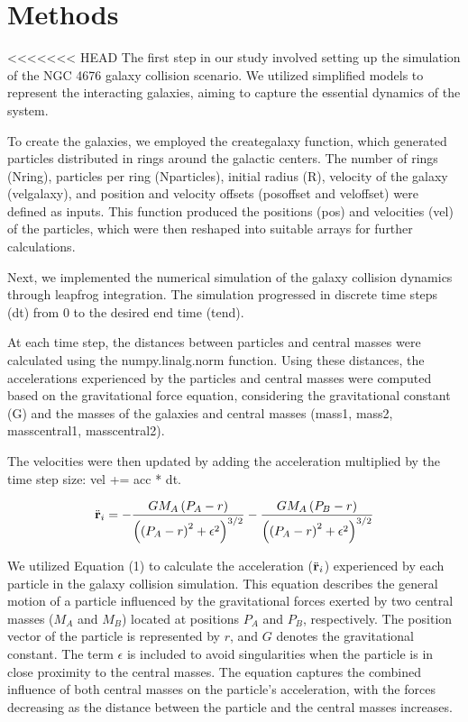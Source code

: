 \documentclass[reprint, amsmath, amssymb, aps]{revtex4-2}
\begin{document}
\section{Methods}
\label{sec:methods}

<<<<<<< HEAD
The first step in our study involved setting up the simulation of the NGC 4676 galaxy collision scenario. We utilized simplified models to represent the interacting galaxies, aiming to capture the essential dynamics of the system.

To create the galaxies, we employed the create\textunderscore galaxy function, which generated particles distributed in rings around the galactic centers. The number of rings (N\textunderscore ring), particles per ring (N\textunderscore particles), initial radius (R), velocity of the galaxy (vel\textunderscore galaxy), and position and velocity offsets (pos\textunderscore offset and vel\textunderscore offset) were defined as inputs. This function produced the positions (pos) and velocities (vel) of the particles, which were then reshaped into suitable arrays for further calculations.

Next, we implemented the numerical simulation of the galaxy collision dynamics through leapfrog integration. The simulation progressed in discrete time steps (dt) from 0 to the desired end time (t\textunderscore end).

At each time step, the distances between particles and central masses were calculated using the numpy.linalg.norm function. Using these distances, the accelerations experienced by the particles and central masses were computed based on the gravitational force equation, considering the gravitational constant (G) and the masses of the galaxies and central masses (mass1, mass2, mass\textunderscore central1, mass\textunderscore central2).

The velocities were then updated by adding the acceleration multiplied by the time step size: vel += acc * dt.

\begin{equation}
\ddot{{\bf r}}_i = - \frac{GM_A\left(P_A - r\right)}{\left(\left(P_A - r\right)^2 + \epsilon^2\right)^{3/2}} - \frac{GM_A\left(P_B - r\right)}{\left(\left(P_A - r\right)^2 + \epsilon^2\right)^{3/2}} 
\label{eq:general_motion}
\end{equation}

We utilized Equation (1) to calculate the acceleration ($\ddot{{\bf r}}_i$) experienced by each particle in the galaxy collision simulation. This equation describes the general motion of a particle influenced by the gravitational forces exerted by two central masses ($M_A$ and $M_B$) located at positions $P_A$ and $P_B$, respectively. The position vector of the particle is represented by $r$, and $G$ denotes the gravitational constant. The term $\epsilon$ is included to avoid singularities when the particle is in close proximity to the central masses. The equation captures the combined influence of both central masses on the particle's acceleration, with the forces decreasing as the distance between the particle and the central masses increases.
\end{document}
